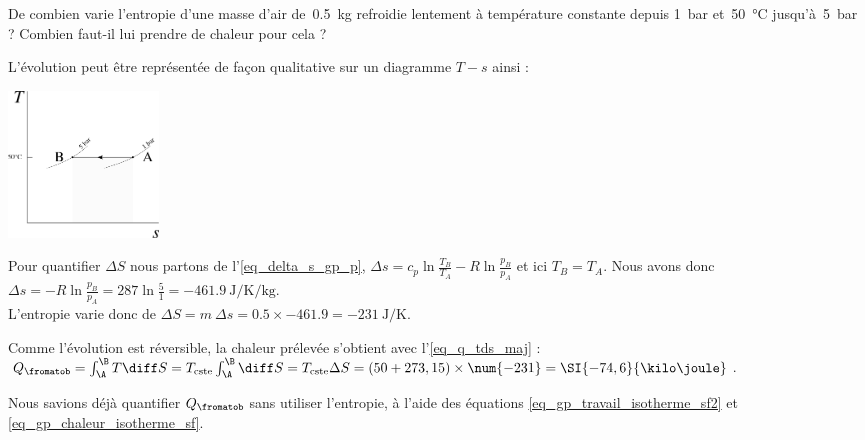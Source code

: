 		\begin{anexample}
			De combien varie l’entropie d’une masse d’air de~\SI{0,5}{\kilogram} refroidie lentement à température constante depuis \SI{1}{\bar} et~\SI{50}{\degreeCelsius} jusqu’à~\SI{5}{\bar} ? Combien faut-il lui prendre de chaleur pour cela ?
			
				\begin{answer}
					L’évolution peut être représentée de façon qualitative sur un diagramme $T-s$ ainsi :
						\begin{center}\includegraphics[width=4cm]{images/exe_ts_2.png}\end{center}
					Pour quantifier $\Delta S$ nous partons de l’\cref{eq_delta_s_gp_p}, $\Delta s = c_p \ln \frac{T_B}{T_A} - R \ln \frac{p_B}{p_A}$ et ici $T_B=T_A$. Nous avons donc $\Delta s = -R \ln \frac{p_B}{p_A} = \num{287} \ln \frac{5}{1} =  \SI{-461,9}{\joule\per\kelvin\per\kilogram}$. \\L’entropie varie donc de $\Delta S = m \ \Delta s = \num{0,5} \times \num{-461,9} = \SI{-231}{\joule\per\kelvin}$.
					
					Comme l’évolution est réversible, la chaleur prélevée s’obtient avec l’\cref{eq_q_tds_maj} : $Q_{\fromatob} = \int_\A^\B T \diff S = T_\text{cste} \int_\A^\B \diff S = T_\text{cste} \Delta S = (50+273,15) \times \num{-231} = \SI{-74,6}{\kilo\joule}$.
				
				\begin{remark}Nous savions déjà quantifier $Q_{\fromatob}$ sans utiliser l’entropie, à l’aide des équations \ref{eq_gp_travail_isotherme_sf2} et \ref{eq_gp_chaleur_isotherme_sf}.\end{remark}\end{answer}
		\end{anexample}

